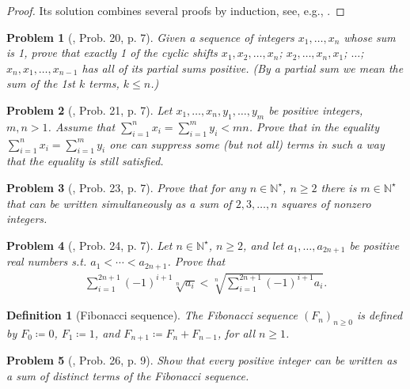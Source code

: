 \documentclass[oneside]{book}
\numberwithin{equation}{section}
\newtheorem{definition}{Definition}[section]
\newtheorem{problem}{Problem}[section]
\begin{document}
\begin{proof}[Proof]
	Its solution combines several proofs by induction, see, e.g., \cite[pp. 5--6]{Gelca_Andreescu2017}.
\end{proof}

\begin{problem}[\cite{Gelca_Andreescu2017}, Prob. 20, p. 7]
	Given a sequence of integers $x_1,\ldots,x_n$ whose sum is 1, prove that exactly 1 of the cyclic shifts $x_1,x_2,\ldots,x_n$; $x_2,\ldots,x_n,x_1$; $\ldots$; $x_n,x_1,\ldots,x_{n-1}$ has all of its partial sums positive. (By a \emph{partial sum} we mean the sum of the 1st $k$ terms, $k\le n$.)
\end{problem}

\begin{problem}[\cite{Gelca_Andreescu2017}, Prob. 21, p. 7]
	Let $x_1,\ldots,x_n,y_1,\ldots,y_m$ be positive integers, $m,n > 1$. Assume that $\sum_{i=1}^n x_i = \sum_{i=1}^m y_i < mn$. Prove that in the equality $\sum_{i=1}^n x_i = \sum_{i=1}^m y_i$ one can suppress some (but not all) terms in such a way that the equality is still satisfied.
\end{problem}

\begin{problem}[\cite{Gelca_Andreescu2017}, Prob. 23, p. 7]
	Prove that for any $n\in\mathbb{N}^\star$, $n\ge 2$ there is $m\in\mathbb{N}^\star$ that can be written simultaneously as a sum of $2,3,\ldots,n$ squares of nonzero integers.
\end{problem}

\begin{problem}[\cite{Gelca_Andreescu2017}, Prob. 24, p. 7]
	Let $n\in\mathbb{N}^\star$, $n\ge 2$, and let $a_1,\ldots,a_{2n+1}$ be positive real numbers s.t. $a_1 < \cdots < a_{2n+1}$. Prove that
	\begin{align*}
		\sum_{i=1}^{2n+1} (-1)^{i+1}\sqrt[n]{a_i} < \sqrt[n]{\sum_{i=1}^{2n+1} (-1)^{i+1}a_i}.
	\end{align*}
\end{problem}

\begin{definition}[Fibonacci sequence]
	The \emph{Fibonacci sequence} $(F_n)_{n\ge 0}$ is defined by $F_0\coloneqq 0$, $F_1\coloneqq 1$, and $F_{n+1}\coloneqq F_n + F_{n-1}$, for all $n\ge 1$.
\end{definition}

\begin{problem}[\cite{Gelca_Andreescu2017}, Prob. 26, p. 9]
	Show that every positive integer can be written as a sum of distinct terms of the Fibonacci sequence.
\end{problem}
\end{document}
